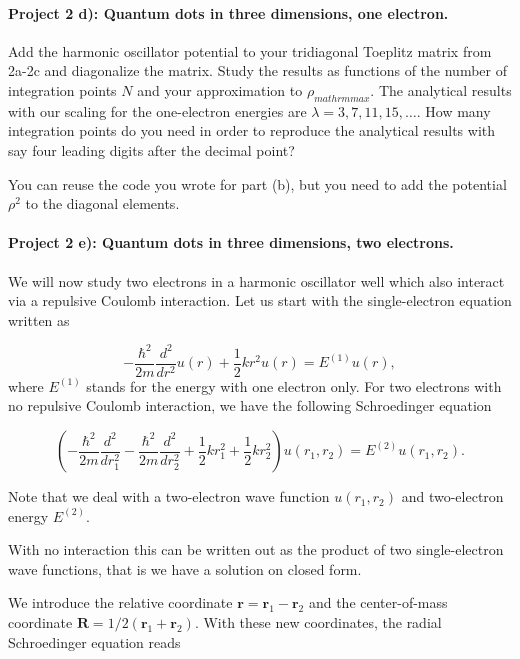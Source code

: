 \documentclass[%
oneside,                 %
final,                   %
10pt]{article}
\begin{document}
\paragraph{Project 2 d): Quantum dots in three dimensions, one electron.}
Add the harmonic oscillator potential to your tridiagonal Toeplitz matrix from 2a-2c and diagonalize the matrix.
Study the results as functions of the number of integration points $N$ and your approximation to $\rho_{mathrm{max}}$. 
The analytical results with our scaling for the one-electron energies are $\lambda=3,7,11,15,\dots$. How many integration points do you need in order to reproduce the analytical results with say four leading digits after the decimal point?

You can reuse the code you wrote for part (b), 
but you need to add  the potential $\rho^2$ to the diagonal elements. 

\paragraph{Project 2 e): Quantum dots in three dimensions, two electrons.}
We will now study two electrons in a harmonic oscillator well which
also interact via a repulsive Coulomb interaction.
Let us start with the single-electron equation written as

\begin{equation*}
  -\frac{\hbar^2}{2 m} \frac{d^2}{dr^2} u(r) 
       + \frac{1}{2}k r^2u(r)  = E^{(1)} u(r),
\end{equation*}
where $E^{(1)}$ stands for the energy with one electron only.
For two electrons with no repulsive Coulomb interaction, we have the following 
Schroedinger equation

\begin{equation*}
\left(  -\frac{\hbar^2}{2 m} \frac{d^2}{dr_1^2} -\frac{\hbar^2}{2 m} \frac{d^2}{dr_2^2}+ \frac{1}{2}k r_1^2+ \frac{1}{2}k r_2^2\right)u(r_1,r_2)  = E^{(2)} u(r_1,r_2) .
\end{equation*}


Note that we deal with a two-electron wave function $u(r_1,r_2)$ and 
two-electron energy $E^{(2)}$.

With no interaction this can be written out as the product of two
single-electron wave functions, that is we have a solution on closed form.

We introduce the relative coordinate $\mathbf{r} = \mathbf{r}_1-\mathbf{r}_2$
and the center-of-mass coordinate $\mathbf{R} = 1/2(\mathbf{r}_1+\mathbf{r}_2)$.
With these new coordinates, the radial Schroedinger equation reads
\end{document}
